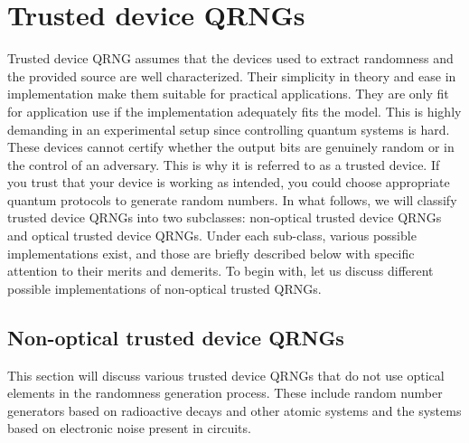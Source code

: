 \documentclass[]{interact}
\theoremstyle{plain}%
\theoremstyle{definition}
\theoremstyle{remark}
\begin{document}
\section{Trusted device QRNGs\label{sec:trusted}}
Trusted device QRNG assumes that the devices used to extract randomness and the provided source are well characterized. Their simplicity in theory and ease in implementation make them suitable for practical applications. They are only fit for application use if the implementation adequately fits the model. This is highly demanding in an experimental setup since controlling quantum systems is hard. These devices cannot certify whether the output bits are genuinely random or in the control of an adversary. This is why it is referred to as a trusted device. If you trust that your device is working as intended, you could choose appropriate quantum protocols to generate random numbers. In what follows, we will classify trusted device QRNGs into two subclasses: non-optical trusted device QRNGs and optical trusted device QRNGs. Under each sub-class, various possible implementations exist, and those are briefly described below with specific attention to their merits and demerits. To begin with, let us discuss different possible implementations of non-optical trusted QRNGs. 

\subsection{Non-optical trusted device QRNGs} 
This section will discuss various trusted device QRNGs that do not use optical elements in the randomness generation process. These include random number generators based on radioactive decays and other atomic systems and the systems based on electronic noise present in circuits.
\end{document}
